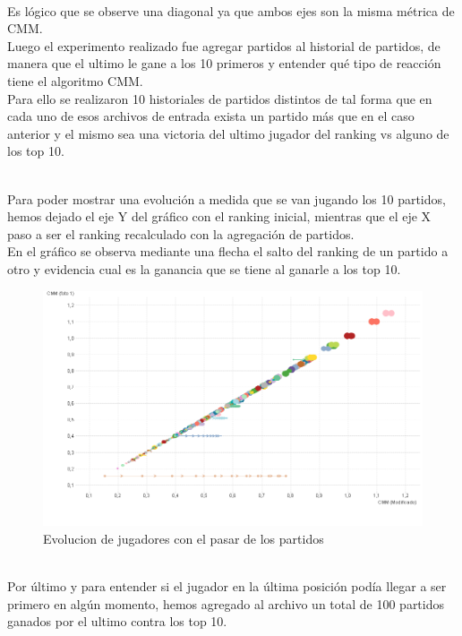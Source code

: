 \\
Es lógico que se observe una diagonal ya que ambos ejes son la misma métrica de CMM.
\\
Luego el experimento realizado fue agregar partidos al historial de partidos, de manera que el ultimo le gane a los 10 primeros y entender qué tipo de reacción tiene el algoritmo CMM.
\\
Para ello se realizaron 10 historiales de partidos distintos de tal forma que en cada uno de esos archivos de entrada exista un partido más que en el caso anterior y
el mismo sea una victoria del ultimo jugador del ranking vs alguno de los top 10.

\\
Para poder mostrar una evolución a medida que se van jugando los 10 partidos, hemos dejado el eje Y del gráfico con el ranking inicial, mientras que el eje X paso a ser el ranking recalculado con la agregación de partidos.\\
En el gráfico se observa mediante una flecha el salto del ranking de un partido a otro y evidencia cual es la ganancia que se tiene al ganarle a los top 10.
\\

\begin{figure}[H]
    \centering
    \includegraphics[width=1\textwidth]{IMG/comparativa cmm -cmm foto 10.png}
    \caption{Evolucion de jugadores con el pasar de los partidos}
    \label{fig:Evolucion de jugadores con el pasar de los partidos}
\end{figure}

\\
Por último y para entender si el jugador en la última posición podía llegar a ser primero en algún momento, hemos agregado al archivo un total de 100 partidos ganados por el ultimo contra
los top 10.
\\

